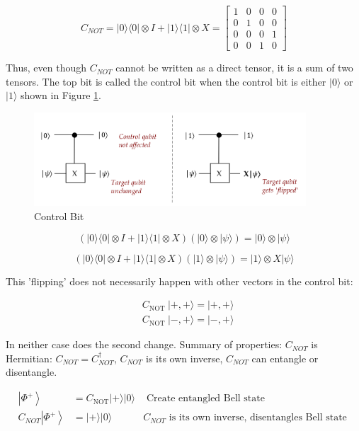 \documentclass[main.tex]{subfiles}
\begin{document}
    $$
    C_{N O T}=|0\rangle\langle 0|\otimes I+| 1\rangle\langle 1| \otimes X=\left[\begin{array}{llll}
    1 & 0 & 0 & 0 \\
    0 & 1 & 0 & 0 \\
    0 & 0 & 0 & 1 \\
    0 & 0 & 1 & 0
    \end{array}\right]
    $$
    
    Thus, even though $C_{NOT}$ cannot be written as a direct tensor, it is a sum of two tensors. The top bit is called the control bit when the control bit is either $|0\rangle$ or $|1\rangle$ shown in Figure \ref{fig:18cnot2}.
    
    \begin{figure}
        \centering
        \includegraphics[width=4in]{notes/figs/n08/18cnot2.png}
        \caption{Control Bit}
        \label{fig:18cnot2}
    \end{figure}
    
    $$
    (|0\rangle\langle 0|\otimes I+| 1\rangle\langle 1| \otimes X)(|0\rangle \otimes|\psi\rangle)=|0\rangle \otimes|\psi\rangle
    $$
    
    $$
    (|0\rangle\langle 0|\otimes I+| 1\rangle\langle 1| \otimes X)(|1\rangle \otimes|\psi\rangle)=|1\rangle \otimes X|\psi\rangle
    $$
    
    This 'flipping' does not necessarily happen with other vectors in the control bit:
    
    $$
    \begin{aligned}
    &C_{\text {NOT }}|+,+\rangle=|+,+\rangle \\
    &C_{\text {NOT }}|-,+\rangle=|-,+\rangle
    \end{aligned}
    $$
    
    In neither case does the second change. Summary of properties: $C_{NOT}$ is Hermitian: $C_{NOT}=C_{N O T}^{\dagger}$, $C_{NOT}$ is its own inverse, $C_{NOT}$ can entangle or disentangle.
    
    $$
    \begin{array}{rll}
    \left|\Phi^{+}\right\rangle & =C_{\text {NOT}}|+\rangle|0\rangle & \text { Create entangled Bell state } \\
    C_{N O T}\left|\Phi^{+}\right\rangle & =|+\rangle|0\rangle & C_{NOT} \text { is its own inverse, disentangles Bell state }
    \end{array}
    $$
    
\end{document}
